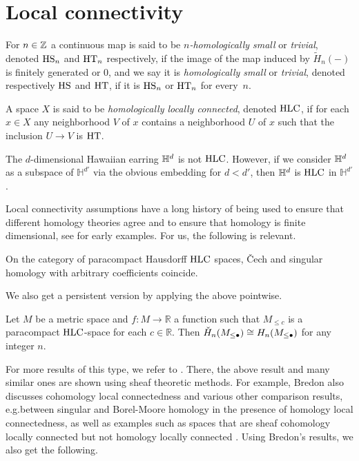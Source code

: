 
\section{Local connectivity}

\begin{defi} \label{defi:local_connectedness}
	For $n \in \mathbb{Z}$ a continuous map is said to be \textit{$n$-homologically small} or \textit{trivial}, denoted $\mathrm{HS}_n$ and $\mathrm{HT}_n$ respectively, if the image of the map induced by $\tilde H_n(-)$ is finitely generated or 0, and we say it is \textit{homologically small} or \textit{trivial}, denoted respectively $\mathrm{HS}$ and $\mathrm{HT}$, if it is $\mathrm{HS}_n$ or $\mathrm{HT}_n$ for every~$n$.
	
	A space $X$ is said to be \emph{homologically locally connected}, denoted $\mathrm{HLC}$, if for each $x \in X$ any neighborhood $V$ of $x$ contains a neighborhood $U$ of $x$ such that the inclusion $U \to V$ is $\mathrm{HT}$.
\end{defi}

\begin{ex}
	The $d$-dimensional Hawaiian earring $\mathbb{H}^d$ is not $\mathrm{HLC}$. However, if we consider $\mathbb{H}^d$ as a subspace of $\mathbb{H}^{d'}$ via the obvious embedding for $d < d'$, then $\mathbb{H}^d$ is $\mathrm{HLC}$ in $\mathbb{H}^{d'}$.
\end{ex}

Local connectivity assumptions have a long history of being used to ensure that different homology theories agree and to ensure that homology is finite dimensional, see \cite{MR0007094} for early examples. For us, the following is relevant.

\begin{prop}[{\cite{MR105677, MR1481706}}]\label{prop:cech_sing_hom_hlc}
	On the category of paracompact Hausdorff $\mathrm{HLC}$ spaces, \v{C}ech and singular homology with arbitrary coefficients coincide.
\end{prop}

We also get a persistent version by applying the above pointwise.

\begin{cor}\label{cor:cech_sing_persistent_iso}
	Let $M$ be a metric space and $f \colon M \to \mathbb{R}$ a function such that $M_{\leq c}$ is a paracompact $\mathrm{HLC}$-space for each $c \in \mathbb{R}$.
	Then $\check{H}_n(M_{\leq \bullet}) \cong H_n(M_{\leq\bullet})$ for any integer $n$.
\end{cor}

For more results of this type, we refer to \cite{MR1481706}. There, the above result \cite[Corollary VI.12.6]{MR1481706} and many similar ones are shown using sheaf theoretic methods. For example, Bredon also discusses cohomology local connectedness \cite[Section II.17]{MR1481706} and various other comparison results, e.g.\@ between singular and Borel-Moore homology \cite[Corollary V.12.15]{MR1481706} in the presence of homology local connectedness, as well as examples such as spaces that are sheaf cohomology locally connected but not homology locally connected \cite[Example II.17.12]{MR1481706}. Using Bredon's results, we also get the following.

